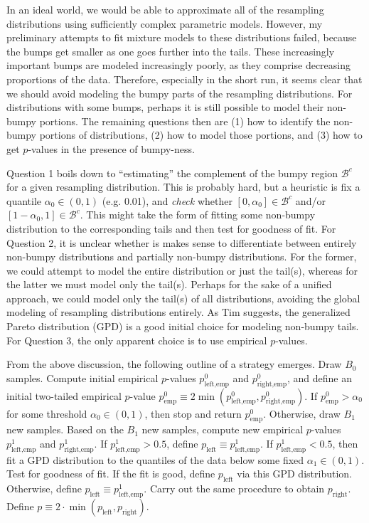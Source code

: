 \documentclass[12pt]{article}
\begin{document}
In an ideal world, we would be able to approximate all of the resampling distributions using sufficiently complex parametric models. However, my preliminary attempts to fit mixture models to these distributions failed, because the bumps get smaller as one goes further into the tails. These increasingly important bumps are modeled increasingly poorly, as they comprise decreasing proportions of the data. Therefore, especially in the short run, it seems clear that we should avoid modeling the bumpy parts of the resampling distributions. For distributions with some bumps, perhaps it is still possible to model their non-bumpy portions. The remaining questions then are (1) how to identify the non-bumpy portions of distributions, (2) how to model those portions, and (3) how to get $p$-values in the presence of bumpy-ness. 

Question 1 boils down to ``estimating'' the complement of the bumpy region $\mathcal B^c$ for a given resampling distribution. This is probably hard, but a heuristic is fix a quantile $\alpha_0 \in (0,1)$ (e.g. 0.01), and \textit{check} whether $[0, \alpha_0] \in \mathcal B^c$ and/or $[1-\alpha_0, 1] \in \mathcal B^c$. This might take the form of fitting some non-bumpy distribution to the corresponding tails and then test for goodness of fit. For Question 2, it is unclear whether is makes sense to differentiate between entirely non-bumpy distributions and partially non-bumpy distributions. For the former, we could attempt to model the entire distribution or just the tail(s), whereas for the latter we must model only the tail(s). Perhaps for the sake of a unified approach, we could model only the tail(s) of all distributions, avoiding the global modeling of resampling distributions entirely. As Tim suggests, the generalized Pareto distribution (GPD) is a good initial choice for modeling non-bumpy tails. For Question 3, the only apparent choice is to use empirical $p$-values. 

From the above discussion, the following outline of a strategy emerges. Draw $B_0$ samples. Compute initial empirical $p$-values $p^0_{\text{left}, \text{emp}}$ and $p^0_{\text{right}, \text{emp}}$, and define an initial two-tailed empirical $p$-value $p^0_{\text{emp}} \equiv 2\min(p^0_{\text{left}, \text{emp}}, p^0_{\text{right}, \text{emp}})$. If $p^0_{\text{emp}} > \alpha_0$ for some threshold $\alpha_0 \in (0,1)$, then stop and return $p^0_{\text{emp}}$. Otherwise, draw $B_1$ new samples. Based on the $B_1$ new samples, compute new empirical $p$-values $p^1_{\text{left}, \text{emp}}$ and $p^1_{\text{right}, \text{emp}}$. If $p^1_{\text{left}, \text{emp}} > 0.5$, define $p_{\text{left}} \equiv p^1_{\text{left}, \text{emp}}$. If $p^1_{\text{left}, \text{emp}} < 0.5$, then fit a GPD distribution to the quantiles of the data below some fixed $\alpha_1 \in (0,1)$. Test for goodness of fit. If the fit is good, define $p_{\text{left}}$ via this GPD distribution. Otherwise, define $p_{\text{left}} \equiv p^1_{\text{left}, \text{emp}}$. Carry out the same procedure to obtain $p_{\text{right}}$. Define $p \equiv 2 \cdot \min(p_{\text{left}}, p_{\text{right}})$. 
\end{document}
